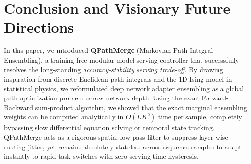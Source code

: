 \section{Conclusion and Visionary Future Directions}
\label{sec:conclusion}

In this paper, we introduced \textbf{QPathMerge} (Markovian Path-Integral Ensembling), a training-free modular model-serving controller that successfully resolves the long-standing \emph{accuracy-stability serving trade-off}. By drawing inspiration from discrete Euclidean path integrals and the 1D Ising model in statistical physics, we reformulated deep network adapter ensembling as a global path optimization problem across network depth. Using the exact Forward-Backward sum-product algorithm, we showed that the exact marginal ensembling weights can be computed analytically in $O(L K^2)$ time per sample, completely bypassing slow differential equation solving or temporal state tracking. QPathMerge acts as a rigorous spatial low-pass filter to suppress layer-wise routing jitter, yet remains absolutely stateless across sequence samples to adapt instantly to rapid task switches with zero serving-time hysteresis.

